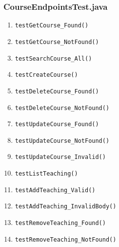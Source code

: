 \subsubsection{CourseEndpointsTest.java}
\begin{enumerate}
	\renewcommand{\theenumi}{\arabic{enumi}}
	\renewcommand{\labelenumi}{\theenumi}
	\item \texttt{testGetCourse\_Found()} \label{test:testGetCourse_Found:Course}
	\item \texttt{testGetCourse\_NotFound()} \label{test:testGetCourse_NotFound:Course}
	\item \texttt{testSearchCourse\_All()} \label{test:testSearchCourse_All:Course}
	\item \texttt{testCreateCourse()} \label{test:testCreateCourse:Course}
	\item \texttt{testDeleteCourse\_Found()} \label{test:testDeleteCourse_Found:Course}
	\item \texttt{testDeleteCourse\_NotFound()} \label{test:testDeleteCourse_NotFound:Course}
	\item \texttt{testUpdateCourse\_Found()} \label{test:testUpdateCourse_Found:Course}
	\item \texttt{testUpdateCourse\_NotFound()} \label{test:testUpdateCourse_NotFound:Course}
	\item \texttt{testUpdateCourse\_Invalid()} \label{test:testUpdateCourse_Invalid:Course}
	\item \texttt{testListTeaching()} \label{test:testListTeaching:Course}
	\item \texttt{testAddTeaching\_Valid()} \label{test:testAddTeaching_Valid:Course}
	\item \texttt{testAddTeaching\_InvalidBody()} \label{test:testAddTeaching_InvalidBody:Course}
	\item \texttt{testRemoveTeaching\_Found()} \label{test:testRemoveTeaching_Found:Course}
	\item \texttt{testRemoveTeaching\_NotFound()} \label{test:testRemoveTeaching_NotFound:Course}
\end{enumerate}

